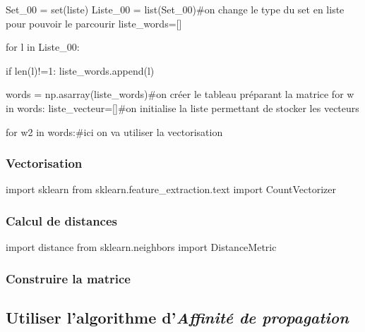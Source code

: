 \begin{python}
Set_00 = set(liste)
Liste_00 = list(Set_00)#on change le type du set en liste pour pouvoir le parcourir
liste_words=[]
        
for l in Liste_00:
                
            if len(l)!=1:
                liste_words.append(l)
        
            words = np.asarray(liste_words)#on créer le tableau préparant la matrice
            for w in words:
                liste_vecteur=[]#on initialise la liste permettant de stocker les vecteurs
            
                    
                for w2 in words:#ici on va utiliser la vectorisation
                
\end{python}               
\vspace{0.5cm}

\subsubsection*{Vectorisation}
\begin{python}   
import sklearn
from sklearn.feature_extraction.text import CountVectorizer

 \end{python}
 
\subsubsection*{Calcul de distances}
 \begin{python}   
import distance
from sklearn.neighbors import DistanceMetric
 \end{python}

\subsubsection*{Construire la matrice}
 \begin{python}   

 \end{python}

\subsection*{Utiliser l'algorithme d'\textit{Affinité de propagation}}
 \begin{python}   

 \end{python}



